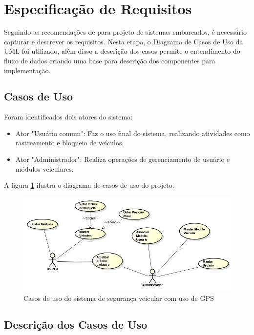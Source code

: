 \section{Especificação de Requisitos}
Seguindo as recomendações de \textcite{Wolf:2001} para projeto de sistemas embarcados, é necessário
capturar e descrever os requisitos. Nesta etapa, o Diagrama de Casos de Uso da UML foi utilizado, além disso a descrição dos casos permite o entendimento do fluxo de dados criando uma base
para descrição dos componentes para implementação.

\subsection{Casos de Uso}

Foram identificados dois atores do sistema: 

\begin{itemize}
	\item Ator "Usuário comum": Faz o uso final do sistema, realizando atividades como rastreamento e bloqueio
	de veículos.
	\item Ator "Administrador": Realiza operações de gerenciamento de usuário e módulos veiculares.
\end{itemize}
  
A figura \ref{fig:casosuso} ilustra o diagrama de casos de uso do projeto.


\begin{figure}[!htb]
\centering
\includegraphics[width=\textwidth]{figures/2_uc.png}
\caption{Casos de uso do sistema de seguran\c{c}a veicular com uso de GPS}
\label{fig:casosuso}
\end{figure}

\subsection{Descrição dos Casos de Uso}

